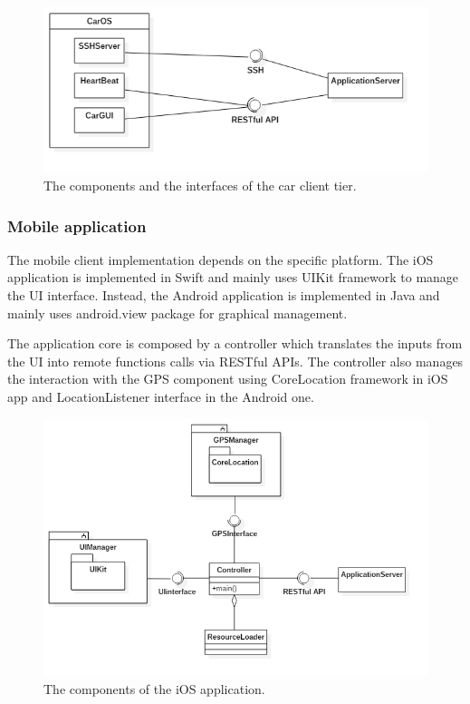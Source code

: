 \begin{figure}[H]
	\centering
	\includegraphics[width=\textwidth, keepaspectratio]{diagrams/CarClientComponents.png}
	\caption{The components and the interfaces of the car client tier.}
	\label {fig:car-client-components}
\end{figure}

\subsubsection{Mobile application}

The mobile client implementation depends on the specific platform. 
The iOS application is implemented in Swift and mainly uses UIKit framework to manage the UI interface.
Instead, the Android application is implemented in Java and mainly uses android.view package for graphical management.

The application core is composed by a controller which translates the inputs from the UI into remote functions calls via  RESTful APIs. The controller also manages the interaction with the GPS component using  CoreLocation framework in iOS app and LocationListener interface in the Android one.

\begin{figure}[H]
    \centering
    \includegraphics[width=\textwidth, keepaspectratio]{diagrams/iOS.png}
    \caption{The components of the iOS application.}
    \label{fig:ios-app}
\end{figure}

